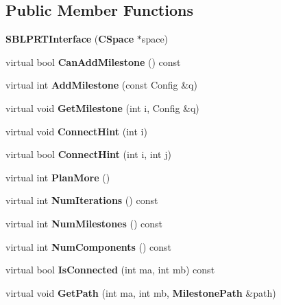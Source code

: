 \subsection*{Public Member Functions}
\begin{DoxyCompactItemize}
\item 
{\bfseries S\+B\+L\+P\+R\+T\+Interface} ({\bf C\+Space} $\ast$space)\label{classSBLPRTInterface_a58e87356bb6eae4e870e0a70e6e38bf7}

\item 
virtual bool {\bfseries Can\+Add\+Milestone} () const \label{classSBLPRTInterface_a58763e501106088127d09ea32844e2c7}

\item 
virtual int {\bfseries Add\+Milestone} (const Config \&q)\label{classSBLPRTInterface_adbddb57c56bb128aaf779e38aa14b975}

\item 
virtual void {\bfseries Get\+Milestone} (int i, Config \&q)\label{classSBLPRTInterface_a13d5d64522fb9e8a408179d29ea77727}

\item 
virtual void {\bfseries Connect\+Hint} (int i)\label{classSBLPRTInterface_aeebdd35d4728d71aecb150e1c1200607}

\item 
virtual bool {\bfseries Connect\+Hint} (int i, int j)\label{classSBLPRTInterface_af9e1e16778d6b93306992405905f7b64}

\item 
virtual int {\bfseries Plan\+More} ()\label{classSBLPRTInterface_a6231771187d70ef22005161b51ee6a14}

\item 
virtual int {\bfseries Num\+Iterations} () const \label{classSBLPRTInterface_a00019abb6796be7544d41a73779a443b}

\item 
virtual int {\bfseries Num\+Milestones} () const \label{classSBLPRTInterface_a2e828ce36fc8c49706b302a27088cd7d}

\item 
virtual int {\bfseries Num\+Components} () const \label{classSBLPRTInterface_adbaef4e9d7cf2de4d278bd82240d2697}

\item 
virtual bool {\bfseries Is\+Connected} (int ma, int mb) const \label{classSBLPRTInterface_aeab450362f1cfa93d6abcaf7f7c676df}

\item 
virtual void {\bfseries Get\+Path} (int ma, int mb, {\bf Milestone\+Path} \&path)\label{classSBLPRTInterface_a7fd6e33cd618ccddabfadba769e5f565}

\end{DoxyCompactItemize}
